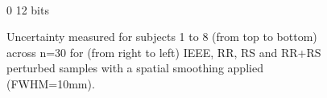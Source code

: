\documentclass{article}
\begin{document}
\begin{appendices}
\begin{landscape}
\begin{figure}
\begin{subfigure}[t]{0.2\paperheight}
            \end{subfigure} \\
            \hspace*{6cm} 0  12 bits
            \caption{Uncertainty measured for subjects 1 to 8 (from top to bottom) across n=30 for
                (from right to left) IEEE, RR, RS and RR+RS perturbed samples with a spatial smoothing applied (FWHM=10mm). }
            \label{fig:uncertainty_10mm}

        \end{figure}
    \end{landscape}

    \begin{landscape}
        \begin{figure}


\end{figure}
\end{landscape}
\end{appendices}
\end{document}
